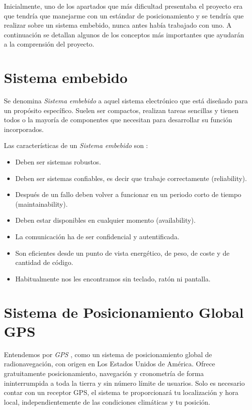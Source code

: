
Inicialmente, uno de los apartados que más dificultad presentaba el proyecto era que tendría que manejarme con un estándar de posicionamiento y se tendría que realizar sobre un sistema embebido, nunca antes había trabajado con uno. A continuación se detallan algunos de los conceptos más importantes que ayudarán a la comprensión del proyecto.

\section{Sistema embebido}
Se denomina \textit{Sistema embebido} \cite{embebido} a aquel sistema electrónico que está diseñado para un propósito específico. Suelen ser compactos, realizan tareas sencillas y tienen todos o la mayoría de componentes que necesitan para desarrollar su función incorporados.

Las características de un \textit{Sistema embebido} son \cite{embebido2}:
\begin{itemize}
\tightlist
\item
	Deben ser sistemas robustos.
\item
	Deben ser sistemas confiables, es decir que trabaje correctamente (reliability).
\item
	Después de un fallo deben volver a funcionar en un periodo corto de tiempo (maintainability).
\item 
	Deben estar disponibles en cualquier momento (availability).
\item 
	La comunicación ha de ser confidencial y autentificada.
\item 
	Son eficientes desde un punto de vista energético, de peso, de coste y de cantidad de código.	
\item 
	Habitualmente nos les encontramos sin teclado, ratón ni pantalla.
\end{itemize}

\section{Sistema de Posicionamiento Global GPS}
Entendemos por \textit{GPS} \cite{GPS}, como un sistema de posicionamiento global de radionavegación, con origen en Los Estados Unidos de América. Ofrece gratuitamente posicionamiento, navegación y cronometría de forma ininterrumpida a toda la tierra y sin número límite de usuarios. Solo es necesario contar con un receptor GPS, el sistema te proporcionará tu localización y hora local, independientemente de las condiciones climáticas y tu posición.

